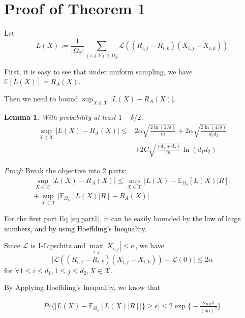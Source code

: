 \documentclass{article}
\numberwithin{equation}{section}
\newcommand{\laks}[1]{\textcolor{black}{#1}}
\newcommand{\supX}{\sup_{X \in \mathcal{X}}}
\newcommand{\E}{\mathbb{E}}
\newtheorem{lemma}{Lemma}
\newtheorem{sampling strategy}{Sampling Strategy}
\begin{document}
\section{Proof of Theorem 1}


Let $$L(X) := \frac{1}{|\Omega_S|} \sum_{(i,j,k) \in \Omega_S}  \mathcal{L}( (R_{i,j} - R_{i,k})(X_{i,j} - X_{i,k}) )$$

First, it is easy to see that under uniform sampling, we have $\mathbb{E}[L(X)] = R_A(X)$. 

Then we need to bound $\sup_{X \in \mathcal{X} } |L(X) - R_A(X)| $.

\begin{lemma}
\label{lemma:bound}
    With probability at least $1 - \delta/2$, 
    \begin{equation}
    \begin{aligned}
        \supX |L(X) - R_A(X)| \leq & 2 \alpha \sqrt{\frac{2\ln(2/\delta)}{m}} + 2\alpha \sqrt{ \frac{2\ln(4/\delta) }{d_1 d_2} } \\
        & + 2 C \sqrt{\frac{(d_1 + d_2)}{m}} \ln(d_1 d_2)
    \end{aligned}
    \end{equation}
\end{lemma}

\emph{Proof:}
Break the objective into 2 parts: 
    \begin{align}
        \supX \Big|L(X) - R_A(X)\Big| \leq \supX \Big|L(X) - \mathbb{E}_{\Omega_S} [L(X) | R] \Big| \label{eq:part1}  \\ 
        + \supX \Big|\mathbb{E}_{\Omega_S} [L(X) | R] - R_A(X) \Big| \label{eq:part2}
    \end{align}

For the first part Eq \ref{eq:part1}, it can be easily bounded by \laks{the law of large numbers, and by using Hoeffding's Inequality}.

Since $\mathcal{L}$ is 1-Lipschitz and $\underset{i,j}{\max} |X_{i,j}| \leq \alpha$, we have 
$$\Big|\mathcal{L}((R_{i,j} - R_{i,k})(X_{i,j} - X_{i,k})) - \mathcal{L}(0) \Big| \leq 2\alpha$$ 
for $\forall 1 \leq i \leq d_1, 1 \leq j \leq d_2,  X \in \mathcal{X}$.

By Applying Hoeffding's Inequality, we know that

\begin{align}
    Pr\Big\{ \big|L(X) - \E_{\Omega_S}[ L(X) | R ]  \big| \Big\} \geq \epsilon ] \leq 2 \exp\Big\{-\frac{2m \epsilon^2}{(4\alpha)^2} \Big\} \nonumber
\end{align}
\end{document}

